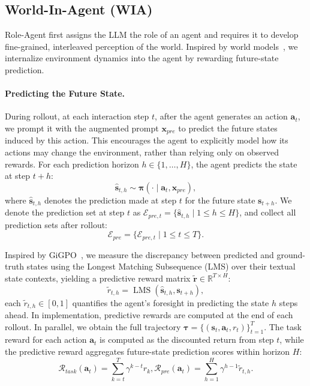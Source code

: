 \documentclass{llmxive}
\providecommand{\bm}[1]{\boldsymbol{#1}}
\begin{document}
\subsection{World-In-Agent (WIA)}
Role-Agent first assigns the LLM the role of an agent and requires it to develop fine-grained, interleaved perception of the world. Inspired by world models~\cite{li2025codei,gu2024your}, we internalize environment dynamics into the agent by rewarding future-state prediction.

\paragraph{Predicting the Future State.}
During rollout, at each interaction step $t$, after the agent generates an action $\bm{a}_t$, we prompt it with the augmented prompt $\bm{x}_{pre}$ to predict the future states induced by this action. This encourages the agent to explicitly model how its actions may change the environment, rather than relying only on observed rewards. For each prediction horizon $h\in\{1,\ldots,H\}$, the agent predicts the state at step $t+h$:
\begin{equation}
    \hat{\bm{s}}_{t,h} \sim \bm{\pi}(\cdot \mid \bm{a}_t,\bm{x}_{pre}),
\end{equation}
where $\hat{\bm{s}}_{t,h}$ denotes the prediction made at step $t$ for the future state $\bm{s}_{t+h}$. We denote the prediction set at step $t$ as $\mathcal{E}_{pre,t}=\{\hat{\bm{s}}_{t,h}\mid 1\le h\le H\}$, and collect all prediction sets after rollout:
\begin{equation}
    \mathcal{E}_{pre}=\{\mathcal{E}_{pre,t}\mid1\le t\le T\}.
\end{equation}

Inspired by GiGPO~\cite{feng2025group}, we measure the discrepancy between predicted and ground-truth states using the Longest Matching Subsequence (LMS) over their textual state contexts, yielding a predictive reward matrix $\tilde{\bm{r}}\in\mathbb{R}^{T\times H}$:
\begin{equation}
    \tilde{r}_{t,h}=\operatorname{LMS}(\hat{\bm{s}}_{t,h},\bm{s}_{t+h}),
\end{equation}
each $\tilde{r}_{t,h}\in[0,1]$ quantifies the agent's foresight in predicting the state $h$ steps ahead. In implementation, predictive rewards are computed at the end of each rollout. In parallel, we obtain the full trajectory $\bm{\tau}=\{(\bm{s}_t,\bm{a}_t,r_t)\}_{t=1}^T$. The task reward for each action $\bm{a}_t$ is computed as the discounted return from step $t$, while the predictive reward aggregates future-state prediction scores within horizon $H$:
\begin{equation}
\mathcal{R}_{task}(\bm{a}_t)\!\!=\!\!\sum_{k=t}^T\gamma^{k-t}r_k, 
     \mathcal{R}_{pre}(\bm{a}_t)\!\!=\!\!\sum_{h=1}^{H}\gamma^{h-1}\tilde{r}_{t,h}. 
\end{equation}
\end{document}
